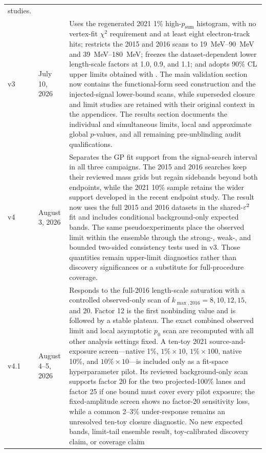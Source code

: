\begin{longtable}{P{0.11\textwidth}P{0.16\textwidth}P{0.64\textwidth}}
studies. \\
\addlinespace
v3 & July 10, 2026 &
Uses the regenerated 2021 1\% high-$p_{\mathrm{sum}}$ histogram, with no vertex-fit
$\chi^2$ requirement and at least eight electron-track hits; restricts the 2015 and
2016 scans to \SIrange{19}{90}{MeV} and \SIrange{39}{180}{MeV}; freezes the
dataset-dependent lower length-scale factors at 1.0, 0.9, and 1.1; and adopts 90\% CL
upper limits obtained with \CLs{}. The main validation section now contains the
functional-form seed construction and the injected-signal lower-bound scans, while
superseded closure and limit studies are retained with their original context in the
appendices. The results section documents the individual and simultaneous limits,
local and approximate global $p$-values, and all remaining pre-unblinding audit
qualifications. \\
\addlinespace
v4 & August 3, 2026 &
Separates the GP fit support from the signal-search interval in all three campaigns.
The 2015 and 2016 searches keep their reviewed mass grids but regain sidebands beyond
both endpoints, while the 2021 10\% sample retains the wider support developed in the
recent endpoint study. The result now uses the full 2015 and 2016 datasets in the
shared-$\varepsilon^2$ fit and includes conditional background-only expected bands. The same
pseudoexperiments place the observed limit within the ensemble through the strong-,
weak-, and bounded two-sided consistency tests used in v3. Those quantities remain
upper-limit diagnostics rather than discovery significances or a substitute for
full-procedure coverage. \\
\addlinespace
v4.1 & August 4--5, 2026 &
Responds to the full-2016 length-scale saturation with a controlled observed-only
scan of $k_{\max,2016}=8,10,12,15,$ and 20. Factor 12 is the first nonbinding value
and is followed by a stable plateau. The exact combined observed limit and local
asymptotic $p_0$ scan are recomputed with all other analysis settings fixed. A
ten-toy 2021 source-and-exposure screen---native 1\%, $1\%\times10$,
$1\%\times100$, native 10\%, and $10\%\times10$---is included only as a fit-space
hyperparameter pilot. Its reviewed background-only scan supports factor 20 for the two
projected-100\% lanes and factor 25 if one bound must cover every pilot exposure;
the fixed-amplitude screen shows no factor-20 sensitivity loss, while a common 2--3\%
under-response remains an unresolved ten-toy closure diagnostic. No new expected
bands, limit-tail ensemble result, toy-calibrated discovery claim, or coverage claim

\end{longtable}
